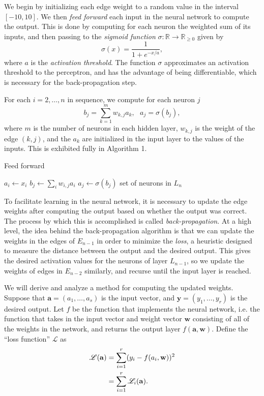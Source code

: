 \documentclass[11pt]{article}
\begin{document}
We begin by initializing each edge weight to a random value in the interval $[-10,10]$. We then \emph{feed forward} each input in the neural network to compute the output. This is done by computing for each neuron the weighted sum of its inputs, and then passing to the \emph{sigmoid function} $\sigma:\mathbb{R}\xrightarrow{\ \ \ \ } \mathbb{R}_{\geq 0}$ given by
\begin{equation}\sigma(x) = \frac{1}{1+e^{-x/a}},\end{equation}
where $a$ is the \emph{activation threshold}. The function $\sigma$ approximates an activation threshold to the perceptron, and has the advantage of being differentiable, which is necessary for the back-propagation step.

For each $i=2,\dots,n$ in sequence, we compute for each neuron $j$
\begin{equation}b_j = \sum_{k=1}^m w_{k,j} a_k, \mathrm{\ \ \ } a_j=\sigma(b_j),\end{equation}
where $m$ is the number of neurons in each hidden layer, $w_{k,j}$ is the weight of the edge $(k,j)$, and the $a_k$ are initialized in the input layer to the values of the inputs. This is exhibited fully in Algorithm 1.

\begin{algorithm}
\caption{Feed forward}
\begin{algorithmic}[1]
  \State $a_i \gets x_i$
\EndFor
{}
    \State $b_j\gets \sum_i w_{i,j} a_i$
    \State $a_j \gets \sigma(b_j)$
  \EndFor
\EndFor
\State \Return set of neurons in $L_n$
\EndFunction
\end{algorithmic}
\end{algorithm}

To facilitate learning in the neural network, it is necessary to update the edge weights after computing the output based on whether the output was correct. The process by which this is accomplished is called \emph{back-propagation}. At a high level, the idea behind the back-propagation algorithm is that we can update the weights in the edges of $E_{n-1}$ in order to minimize the \emph{loss}, a heuristic designed to measure the distance between the output and the desired output. This gives the desired activation values for the neurons of layer $L_{n-1}$, so we update the weights of edges in $E_{n-2}$ similarly, and recurse until the input layer is reached. 

We will derive and analyze a method for computing the updated weights. Suppose that $\mathbf{a}=(a_1,\dots,a_s)$ is the input vector, and $\mathbf{y}=(y_1,\dots,y_r)$ is the desired output. Let $f$ be the function that implements the neural network, i.e. the function that takes in the input vector and weight vector $\mathbf{w}$ consisting of all of the weights in the network, and returns the output layer $f(\mathbf{a},\mathbf{w})$. Define the ``loss function'' $\mathscr{L}$ as
\begin{align}\mathscr{L}(\mathbf{a})&=\sum_{i=1}^r (y_i - f(a_i,\mathbf{w}))^2\notag\\
&=\sum_{i=1}^r \mathscr{L}_i(\mathbf{a}).\end{align}
\end{document}
